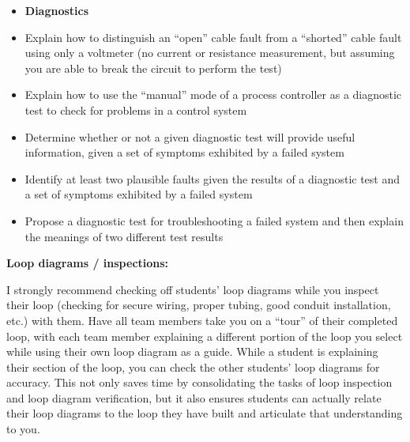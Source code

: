 \filbreak

\begin{itemize}
\item{} {\bf Diagnostics}
\item{} Explain how to distinguish an ``open'' cable fault from a ``shorted'' cable fault using only a voltmeter (no current or resistance measurement, but assuming you are able to break the circuit to perform the test)
\item{} Explain how to use the ``manual'' mode of a process controller as a diagnostic test to check for problems in a control system
\item{} Determine whether or not a given diagnostic test will provide useful information, given a set of symptoms exhibited by a failed system
\item{} Identify at least two plausible faults given the results of a diagnostic test and a set of symptoms exhibited by a failed system
\item{} Propose a diagnostic test for troubleshooting a failed system and then explain the meanings of two different test results
\end{itemize}
















\noindent
{\bf Loop diagrams / inspections:}

I strongly recommend checking off students' loop diagrams while you inspect their loop (checking for secure wiring, proper tubing, good conduit installation, etc.) with them.  Have all team members take you on a ``tour'' of their completed loop, with each team member explaining a different portion of the loop you select while using their own loop diagram as a guide.  While a student is explaining their section of the loop, you can check the other students' loop diagrams for accuracy.  This not only saves time by consolidating the tasks of loop inspection and loop diagram verification, but it also ensures students can actually relate their loop diagrams to the loop they have built and articulate that understanding to you.











